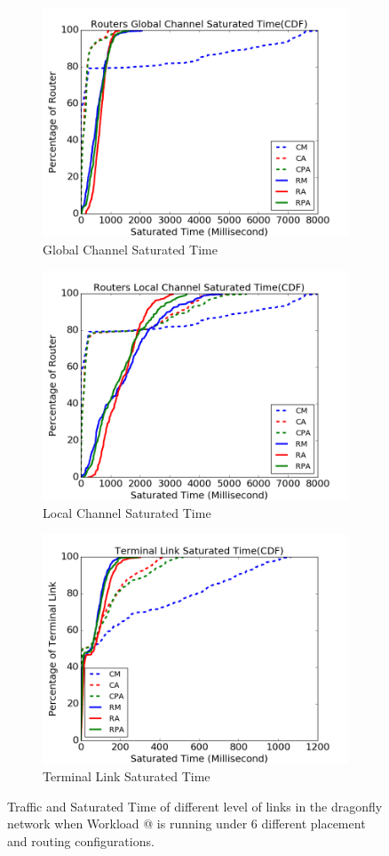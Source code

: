 \documentclass[conference,compsoc]{IEEEtran}
\makeatletter
\newcommand{\Rmnum}[1]{\expandafter\@slowromancap\romannumeral #1@}
\makeatother
\begin{document}
\begin{figure}[t]
    \begin{subfigure}[t]{0.32\textwidth}
        \centering
        \includegraphics[height=1.8 in]{syn-wkld/gc-btime}
        \caption{Global Channel Saturated Time}
        \label{fig:synwkld-global-channel-stime}
    \end{subfigure}\hfill
     \hspace{1em}%
    \begin{subfigure}[t]{0.32\textwidth}
        \centering
        \includegraphics[height=1.8 in]{syn-wkld/lc-btime}
        \caption{Local Channel Saturated Time}
        \label{fig:synwkld-local-channel-stime}
    \end{subfigure}\hfill
    \hspace{1em}%
    \begin{subfigure}[t]{0.32\textwidth}
        \centering
        \includegraphics[height=1.8 in]{syn-wkld/tl-btime}
        \caption{Terminal Link Saturated Time}
        \label{fig:synwkld-terminal-link-stime}
    \end{subfigure}%
   \caption{Traffic and Saturated Time of different level of links in the dragonfly network when Workload \Rmnum{2} is running under 6 different placement and routing configurations.}
   \label{fig:synwkld-network-traffic-stime}
\end{figure}
\end{document}
